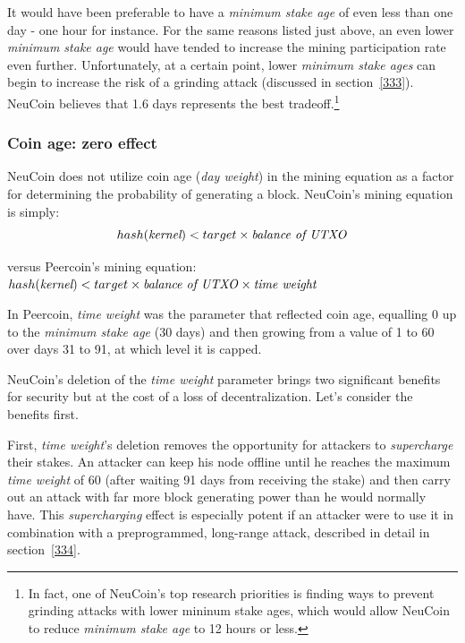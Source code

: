 \documentclass[a4paper,11pt]{article}
\begin{document}
It would have been preferable to have a \textit{minimum stake age} of even less than one day - one hour for instance. For the same reasons listed just above, an even lower \textit{minimum stake age} would have tended to increase the mining participation rate even further. Unfortunately, at a certain point, lower \textit{minimum stake ages} can begin to increase the risk of a grinding attack (discussed in section~\ref{333}). NeuCoin believes that 1.6 days represents the best tradeoff.\footnote{In fact, one of NeuCoin's top research priorities is finding ways to prevent grinding attacks with lower mininum stake ages, which would allow NeuCoin to reduce \textit{minimum stake age} to 12 hours or less.}


\subsubsection*{Coin age: zero effect}

NeuCoin does not utilize coin age (\textit{day weight}) in the mining equation as a factor for determining the probability of generating a block. NeuCoin's mining equation is simply:$$ hash(\textit{kernel}) < target \times \text{\textit{balance of \textit{UTXO}}} $$

versus Peercoin's mining equation: $ hash(\textit{kernel}) < target \times \text{\textit{balance of \textit{UTXO}}} \times \text{\textit{time weight}}$
\vspace{1mm}

In Peercoin, \textit{time weight} was the parameter that reflected coin age, equalling 0 up to the \textit{minimum stake age} (30 days) and then growing from a value of 1 to 60 over days 31 to 91, at which level it is capped.

NeuCoin's deletion of the \textit{time weight} parameter brings two significant benefits for security but at the cost of a loss of decentralization. Let's consider the benefits first.

First, \textit{time weight}'s deletion removes the opportunity for attackers to \textit{supercharge} their stakes. An attacker can keep his node offline until he reaches the maximum \textit{time weight} of 60 (after waiting 91 days from receiving the stake) and then carry out an attack with far more block generating power than he would normally have. This \textit{supercharging} effect is especially potent if an attacker were to use it in combination with a preprogrammed, long-range attack, described in detail in section~\ref{334}.
\end{document}
